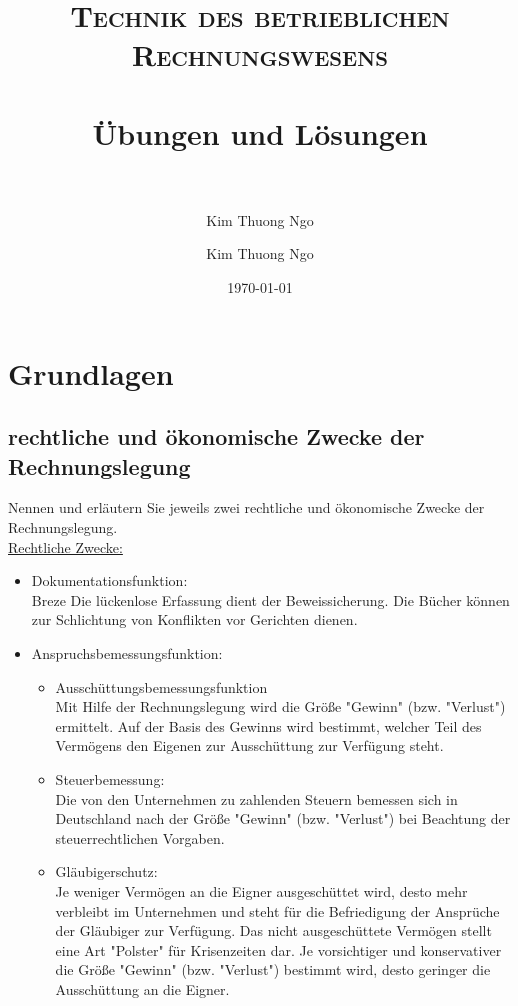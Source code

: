 \documentclass[paper=a4, fontsize=11pt]{scrartcl}
\author{Kim Thuong Ngo}
\title{
\normalfont \normalsize
\textsc{Technik des betrieblichen Rechnungswesens} \\ [25pt]
\horrule{0.5pt} \\[0.4cm]
\huge Übungen und Lösungen\\
\horrule{2pt} \\[0.5cm]
}
\author{Kim Thuong Ngo}
\date{\normalsize\today}
\numberwithin{equation}{section}
\numberwithin{figure}{section}
\numberwithin{table}{section}
\begin{document}
\maketitle
\newpage
\tableofcontents
\newpage
\section{Grundlagen}
\subsection{rechtliche und ökonomische Zwecke der Rechnungslegung}
Nennen und erläutern Sie jeweils zwei rechtliche und ökonomische Zwecke der Rechnungslegung. \\

\underline{Rechtliche Zwecke:}

\begin{itemize}
\item Dokumentationsfunktion: \\
Breze
Die lückenlose Erfassung dient der Beweissicherung. Die Bücher können zur Schlichtung von Konflikten vor Gerichten dienen.

\item Anspruchsbemessungsfunktion:
  \begin{itemize}
  \item Ausschüttungsbemessungsfunktion \\
Mit Hilfe der Rechnungslegung wird die Größe "Gewinn" (bzw. "Verlust") ermittelt. Auf  der Basis des Gewinns wird bestimmt, welcher Teil des Vermögens den Eigenen zur Ausschüttung zur Verfügung steht.
  \item Steuerbemessung: \\
Die von den Unternehmen zu zahlenden Steuern bemessen sich in Deutschland nach der Größe "Gewinn" (bzw. "Verlust") bei Beachtung der steuerrechtlichen Vorgaben.
  \item Gläubigerschutz: \\
Je weniger Vermögen an die Eigner ausgeschüttet wird, desto mehr verbleibt im Unternehmen und steht für die Befriedigung der Ansprüche der Gläubiger zur Verfügung. Das nicht ausgeschüttete Vermögen stellt eine Art "Polster" für Krisenzeiten dar. Je vorsichtiger und konservativer die Größe "Gewinn" (bzw. "Verlust") bestimmt wird, desto geringer die Ausschüttung an die Eigner.
\end{itemize}
\end{itemize}
\end{document}
